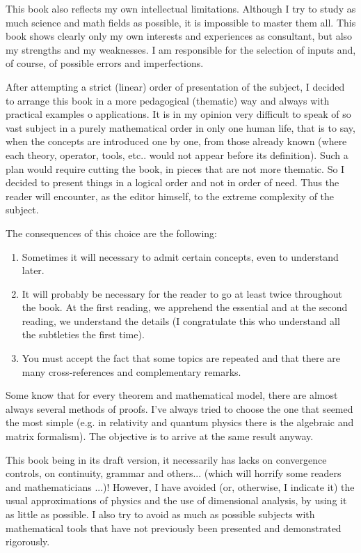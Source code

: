 	This book also reflects my own intellectual limitations. Although I try to study as much science and math fields as possible, it is impossible to master them all. This book shows clearly only my own interests and experiences as consultant, but also my strengths and my weaknesses. I am responsible for the selection of inputs and, of course, of possible errors and imperfections.

	After attempting a strict (linear) order of presentation of the subject, I decided to arrange this book in a more pedagogical (thematic) way and always with practical examples o applications. It is in my opinion very difficult to speak of so vast subject in a purely mathematical order in only one human life, that is to say, when the concepts are introduced one by one, from those already known (where each theory, operator, tools, etc.. would not appear before its definition). Such a plan would require cutting the book, in pieces that are not more thematic. So I decided to present things in a logical order and not in order of need. Thus the reader will encounter, as the editor himself, to the extreme complexity of the subject.

	The consequences of this choice are the following:
	\begin{enumerate}
		\item Sometimes it will necessary to admit certain concepts, even to understand later.
	
		\item It will probably be necessary for the reader to go at least twice throughout the book. At the first reading, we apprehend the essential and at the second reading, we understand the details (I congratulate this who understand all the subtleties the first time).
	
		\item You must accept the fact that some topics are repeated and that there are many cross-references and complementary remarks.
	\end{enumerate}
	
	Some know that for every theorem and mathematical model, there are almost always several methods of proofs. I've always tried to choose the one that seemed the most simple (e.g. in relativity and quantum physics there is the algebraic and matrix formalism). The objective is to arrive at the same result anyway.
	
	This book being in its draft version, it necessarily has lacks on convergence controls, on continuity, grammar and others... (which will horrify some readers and mathematicians ...)! However, I have avoided (or, otherwise, I indicate it) the usual approximations of physics and the use of dimensional analysis, by using it as little as possible. I also try to avoid as much as possible subjects with mathematical tools that have not previously been presented and demonstrated rigorously.
	
